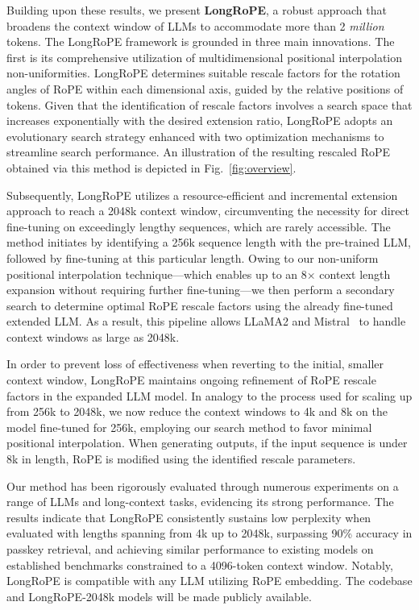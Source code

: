 Building upon these results, we present \textbf{LongRoPE}, a robust approach that broadens the context window of LLMs to accommodate more than 2 \emph{million} tokens. The LongRoPE framework is grounded in three main innovations. The first is its comprehensive utilization of multidimensional positional interpolation non-uniformities. LongRoPE determines suitable rescale factors for the rotation angles of RoPE within each dimensional axis, guided by the relative positions of tokens. Given that the identification of rescale factors involves a search space that increases exponentially with the desired extension ratio, LongRoPE adopts an evolutionary search strategy enhanced with two optimization mechanisms to streamline search performance. An illustration of the resulting rescaled RoPE obtained via this method is depicted in Fig.~\ref{fig:overview}.

Subsequently, {LongRoPE} utilizes a resource-efficient and incremental extension approach to reach a 2048k context window, circumventing the necessity for direct fine-tuning on exceedingly lengthy sequences, which are rarely accessible. The method initiates by identifying a 256k sequence length with the pre-trained LLM, followed by fine-tuning at this particular length. Owing to our non-uniform positional interpolation technique—which enables up to an 8$\times$ context length expansion without requiring further fine-tuning—we then perform a secondary search to determine optimal RoPE rescale factors using the already fine-tuned extended LLM. As a result, this pipeline allows LLaMA2 and Mistral~\cite{mistral} to handle context windows as large as 2048k.

In order to prevent loss of effectiveness when reverting to the initial, smaller context window, {LongRoPE} maintains ongoing refinement of RoPE rescale factors in the expanded LLM model. In analogy to the process used for scaling up from 256k to 2048k, we now reduce the context windows to 4k and 8k on the model fine-tuned for 256k, employing our search method to favor minimal positional interpolation. When generating outputs, if the input sequence is under 8k in length, RoPE is modified using the identified rescale parameters.

Our method has been rigorously evaluated through numerous experiments on a range of LLMs and long-context tasks, evidencing its strong performance. The results indicate that LongRoPE consistently sustains low perplexity when evaluated with lengths spanning from 4k up to 2048k, surpassing 90\% accuracy in passkey retrieval, and achieving similar performance to existing models on established benchmarks constrained to a 4096-token context window. Notably, LongRoPE is compatible with any LLM utilizing RoPE embedding. The codebase and LongRoPE-2048k models will be made publicly available.

